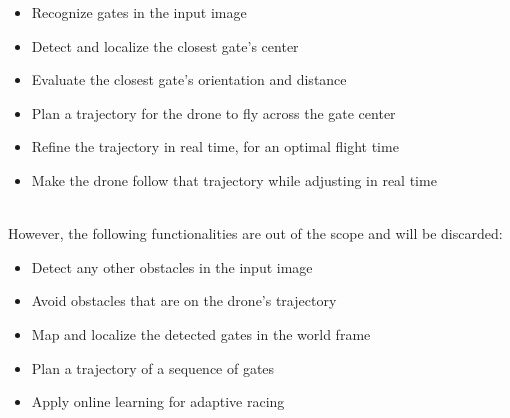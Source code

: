 \begin{itemize}
	\item{Recognize gates in the input image}
	\item{Detect and localize the closest gate's center}
	\item{Evaluate the closest gate's orientation and distance}
	\item{Plan a trajectory for the drone to fly across the gate center}
	\item{Refine the trajectory in real time, for an optimal flight time}
	\item{Make the drone follow that trajectory while adjusting in real time}
\end{itemize}
~\\
However, the following functionalities are out of the scope and will be
discarded:

\begin{itemize}
	\item{Detect any other obstacles in the input image}
	\item{Avoid obstacles that are on the drone's trajectory}
	\item{Map and localize the detected gates in the world frame}
	\item{Plan a trajectory of a sequence of gates}
	\item{Apply online learning for adaptive racing}
\end{itemize}
